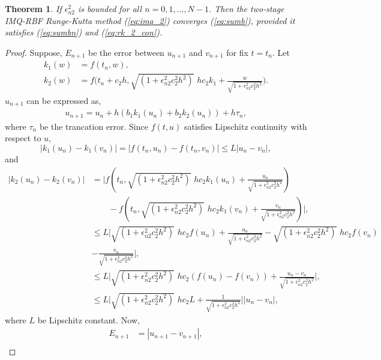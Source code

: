 \documentclass[a4paper, preprint,11pt]{elsarticle}
\newtheorem{theorem}{Theorem}[section]
\numberwithin{equation}{section}
\begin{document}
\begin{theorem} If $\epsilon_{n2}^2$
is bounded for all $n = 0, 1, \dots, N - 1$. Then the
two-stage IMQ-RBF Runge-Kutta method ({\ref{eq:imq_2}}) converges ({\ref{eq:sumb}}), provided it satisfies ({\ref{eq:sumbn}}) and
({\ref{eq:rk_2_con}}).
\end{theorem}
\begin{proof} Suppose, $E_{n+1}$ be the error between $u_{n+1}$ and $v_{n+1}$ for fix $t = t_n$. Let
\begin{align*}
k_1(w) &= f(t_n, w), \\
k_2(w) &= f\biggl(t_n + c_2h, \sqrt{(1 + \epsilon_{n2}^2 c_{2}^2 h^2)} \,\, h c_2 k_1 + \frac{w} {\sqrt{1 + \epsilon_{n2}^2 c_{2}^2 h^2}}\biggl).
\end{align*}
 $u_{n+1}$ can be expressed as,
\begin{align*}
 u_{n+1} = u_n + h (b_1k_1(u_n) + b_2k_2(u_n)) + h \tau_n,
\end{align*}
where $ \tau_n$ be the trancation error.
Since  $f(t, u)$ satisfies Lipschitz continuity with respect to $u$,
\begin{equation*}
|k_1(u_n)- k_1(v_n)| = |f(t_n, u_n)-f(t_n, v_n)| \leq L|u_n - v_n|,
\end{equation*}
and 
\begin{align*}
    |k_2(u_n)- k_2(v_n)| & = \Biggl|f\left(t_n, \sqrt{(1 + \epsilon_{n2}^2 c_{2}^2 h^2)} \,\, h c_2 k_1 (u_n) + \frac{u_n} {\sqrt{1 + \epsilon_{n2}^2 c_{2}^2 h^2}}\right) \\
    &\qquad -f \left(t_n, \sqrt{(1 + \epsilon_{n2}^2 c_{2}^2 h^2)} \,\, h c_2 k_1(v_n) + \frac{v_n} {\sqrt{1 + \epsilon_{n2}^2 c_{2}^2 h^2}}\right)\Biggl|, \\
    & \leq L\Biggl|\sqrt{(1 + \epsilon_{n2}^2 c_{2}^2 h^2)}\,\,  h c_2 f(u_n) + \frac{u_n} {\sqrt{1 + \epsilon_{n2}^2 c_{2}^2 h^2}} - \sqrt{(1 + \epsilon_{n2}^2 c_{2}^2 h^2)}\,\,  h c_2 f (v_n)\\
    & - \frac{v_n} {\sqrt{1 + \epsilon_{n2}^2 c_{2}^2 h^2}} \Biggl|, \\
    & \leq L\biggl|\sqrt{(1 + \epsilon_{n2}^2 c_{2}^2 h^2)} \,\, h c_2 (f(u_n) - f(v_n)) + \frac{u_n - v_n} {\sqrt{1 + \epsilon_{n2}^2 c_{2}^2 h^2}}\biggl|, \\
   &  \leq L\biggl|\sqrt{(1 + \epsilon_{n2}^2 c_{2}^2 h^2)} \,\, h c_2 L + \frac{1} {\sqrt{1 + \epsilon_{n2}^2 c_{2}^2 h^2}}\biggl||u_n - v_n|,
\end{align*}
where $L$ be Lipschitz constant. Now,
\begin{align*}
    E_{n+1} & = |u_{n+1} - v_{n+1}|, \\

\end{align*}
\end{proof}
\end{document}
